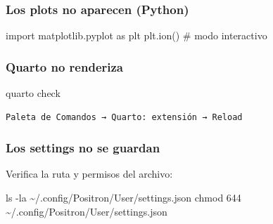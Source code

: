 \documentclass[
  doc,
  floatsintext,
  longtable,
  a4paper,
  nolmodern,
  notxfonts,
  notimes,
  12pt,
  colorlinks=true,linkcolor=blue,citecolor=blue,urlcolor=blue]{apa7}
\newenvironment{Shaded}{\begin{snugshade}}{\end{snugshade}}
\newcommand{\AttributeTok}[1]{\textcolor[rgb]{0.40,0.45,0.13}{#1}}
\newcommand{\BuiltInTok}[1]{\textcolor[rgb]{0.00,0.23,0.31}{#1}}
\newcommand{\CommentTok}[1]{\textcolor[rgb]{0.37,0.37,0.37}{#1}}
\newcommand{\ExtensionTok}[1]{\textcolor[rgb]{0.00,0.23,0.31}{#1}}
\newcommand{\FunctionTok}[1]{\textcolor[rgb]{0.28,0.35,0.67}{#1}}
\newcommand{\ImportTok}[1]{\textcolor[rgb]{0.00,0.46,0.62}{#1}}
\newcommand{\NormalTok}[1]{\textcolor[rgb]{0.00,0.23,0.31}{#1}}
\newcommand{\OperatorTok}[1]{\textcolor[rgb]{0.37,0.37,0.37}{#1}}
\newcommand{\StringTok}[1]{\textcolor[rgb]{0.13,0.47,0.30}{#1}}
\newcommand{\VariableTok}[1]{\textcolor[rgb]{0.07,0.07,0.07}{#1}}
\begin{document}
\begin{Shaded}
\end{Shaded}

\subsubsection{Los plots no aparecen
(Python)}\label{los-plots-no-aparecen-python}

\begin{Shaded}
\begin{Highlighting}[]
\ImportTok{import}\NormalTok{ matplotlib.pyplot }\ImportTok{as}\NormalTok{ plt}
\NormalTok{plt.ion()  }\CommentTok{\# modo interactivo}
\end{Highlighting}
\end{Shaded}

\subsubsection{Quarto no renderiza}\label{quarto-no-renderiza}

\begin{Shaded}
\begin{Highlighting}[]
\ExtensionTok{quarto}\NormalTok{ check}
\end{Highlighting}
\end{Shaded}

\begin{verbatim}
Paleta de Comandos → Quarto: extensión → Reload
\end{verbatim}

\subsubsection{Los settings no se
guardan}\label{los-settings-no-se-guardan}

Verifica la ruta y permisos del archivo:

\begin{Shaded}
\begin{Highlighting}[]
\FunctionTok{ls} \AttributeTok{{-}la}\NormalTok{ \textasciitilde{}/.config/Positron/User/settings.json}
\FunctionTok{chmod}\NormalTok{ 644 \textasciitilde{}/.config/Positron/User/settings.json}
\end{Highlighting}
\end{Shaded}
\end{document}
